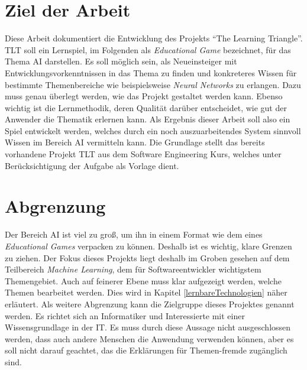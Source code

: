 \section{Ziel der Arbeit}

Diese Arbeit dokumentiert die Entwicklung des Projekts "`The Learning Triangle"'. TLT soll ein Lernspiel, im Folgenden als \textit{Educational Game} bezeichnet, für das Thema AI darstellen. Es soll möglich sein, als Neueinsteiger mit Entwicklungsvorkenntnissen in das Thema zu finden und konkreteres Wissen für bestimmte Themenbereiche wie beispielsweise \textit{Neural Networks} zu erlangen. Dazu muss genau überlegt werden, wie das Projekt gestaltet werden kann. Ebenso wichtig ist die Lernmethodik, deren Qualität darüber entscheidet, wie gut der Anwender die Thematik erlernen kann. Als Ergebnis dieser Arbeit soll also ein Spiel entwickelt werden, welches durch ein noch auszuarbeitendes System sinnvoll Wissen im Bereich AI vermitteln kann. Die Grundlage stellt das bereits vorhandene Projekt TLT aus dem Software Engineering Kurs, welches unter Berücksichtigung der Aufgabe als Vorlage dient.

\section{Abgrenzung}

Der Bereich AI ist viel zu groß, um ihn in einem Format wie dem eines \textit{Educational Games} verpacken zu können. Deshalb ist es wichtig, klare Grenzen zu ziehen. Der Fokus dieses Projekts liegt deshalb im Groben gesehen auf dem Teilbereich \textit{Machine Learning}, dem für Softwareentwickler wichtigstem Themengebiet. Auch auf feinerer Ebene muss klar aufgezeigt werden, welche Themen bearbeitet werden. Dies wird in Kapitel \ref{lernbareTechnologien} näher erläutert. Als weitere Abgrenzung kann die Zielgruppe dieses Projektes genannt werden. Es richtet sich an Informatiker und Interessierte mit einer Wissensgrundlage in der IT. Es muss durch diese Aussage nicht ausgeschlossen werden, dass auch andere Menschen die Anwendung verwenden können, aber es soll nicht darauf geachtet, das die Erklärungen für Themen-fremde zugänglich sind.